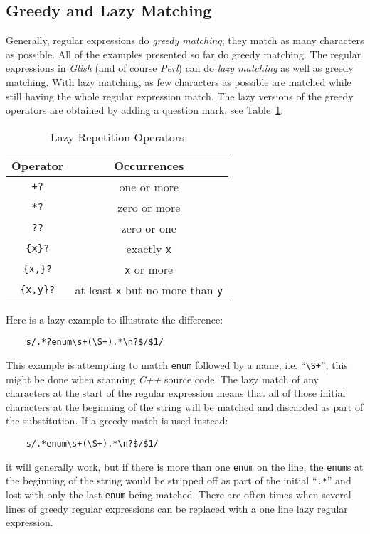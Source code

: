 \subsection{Greedy and Lazy Matching}
Generally, regular expressions do {\em greedy matching}; they match as many characters
as possible. All of the examples presented so far do greedy matching. The regular
expressions in {\em Glish} (and of course {\em Perl}) can do {\em lazy matching} as well as
greedy matching. With lazy matching, as few characters as possible are matched
while still having the whole regular expression match. The lazy versions of the
greedy operators are obtained by adding a question mark, see
Table~\ref{regex-lazy}.
\begin{table}[tbh]
\begin{center}
\begin{tabular}{|c|c|}
\hline
Operator & Occurrences \\
\hline
\hline
\verb-+?-     & one or more \\ \hline
\verb-*?-     & zero or more \\ \hline
\verb-??-     & zero or one \\ \hline
\verb-{x}?-   & exactly {\tt x} \\ \hline
\verb-{x,}?-  & {\tt x} or more\\ \hline
\verb-{x,y}?- & at least {\tt x} but no more than {\tt y}\\ \hline
\end{tabular}
\end{center}

\caption{ Lazy Repetition Operators }
\label{regex-lazy}
\end{table}

Here is a lazy example to illustrate the difference:
\begin{verbatim}
    s/.*?enum\s+(\S+).*\n?$/$1/
\end{verbatim}
This example is attempting to match {\tt enum} followed by a name, i.e.
``\verb-\S+-''; this might be done when scanning {\em C++} source code. The
lazy match of any characters at the start of the regular expression means
that all of those initial characters at the beginning of the string will be
matched and discarded as part of the substitution. If a greedy match is
used instead:
\begin{verbatim}
    s/.*enum\s+(\S+).*\n?$/$1/
\end{verbatim}
it will generally work, but if there is more than one {\tt enum} on the
line, the {\tt enum}s at the beginning of the string would be stripped off
as part of the initial ``\verb+.*+'' and lost with only the last {\tt enum}
being matched. There are often times when several lines of greedy regular
expressions can be replaced with a one line lazy regular expression.


